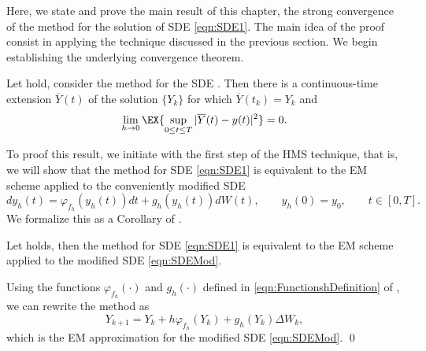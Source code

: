 	Here, we state and prove the main result of this chapter, the strong convergence of the \SM method
  for the solution of SDE \eqref{eqn:SDE1}.
The main idea of the proof consist in applying the technique discussed in the previous section.
We begin establishing the underlying convergence theorem.
\begin{thm} %
	\label{thm:StrongConvergenceLSMethod}
	Let  hold, consider the \SM method  for the 
	SDE	.
	Then there is a continuous-time extension $\overline{Y}(t)$ of the \SM solution $\{Y_k\}$ for which 
	$\overline{Y}(t_k)=Y_k$ and
	\begin{equation*}
	\lim_{h \to 0}
	\EX{
		\sup_{0\leq t \leq T}
		|\overline{Y}(t) - y(t)|^2	
	}=0.
	\end{equation*} 
\end{thm}
To proof this result, we initiate with the first step of the HMS technique, that is, we will show that the \SM method
for SDE \eqref{eqn:SDE1} is equivalent to the EM scheme applied to the conveniently modified SDE
	\begin{equation} \label{eqn:SDEMod}
		dy_h(t)= \varphi_{f_h}(y_h(t))dt +g_h(y_h(t))dW(t),
		\qquad y_h(0)=y_0,  \qquad t\in [0,T].
	\end{equation}
We formalize this as a Corollary of .

\begin{corollary}\label{col:SSSMeEMmod}
	Let  holds, then the \SM method for SDE \eqref{eqn:SDE1} is 
	equivalent to the EM scheme applied to the modified SDE \eqref{eqn:SDEMod}.
\end{corollary}
\begin{pf}
	Using the functions $\varphi_{f_h}(\cdot)$ and $g_h(\cdot)$ defined in \eqref{eqn:FunctionshDefinition} of 
	, we 
	can rewrite the \SM method  as 
	$$
		Y_{k+1} = Y_k + h \varphi_{f_h}(Y_k) + g_h(Y_k)\Delta W_k,
	$$
	which is the EM approximation for the modified SDE \eqref{eqn:SDEMod}. \qed
\end{pf}

